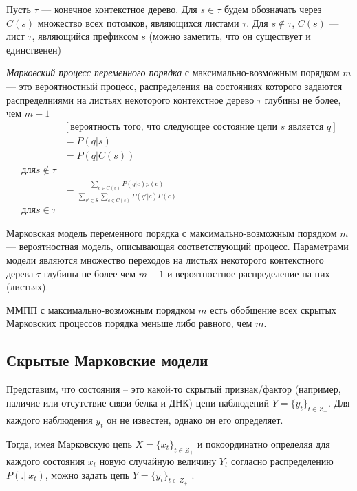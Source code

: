 \documentclass{matmex-diploma-custom}
\begin{document}
Пусть $\tau$ --- конечное контекстное дерево.
Для $s \in \tau$ будем обозначать через $ C(s) $ множество всех потомков, являющихся листами $\tau$. 
Для $s \notin \tau$, $C(s)$ --- лист $\tau$, являющийся префиксом  $s$ (можно заметить, что он существует и единственен)
\begin{definition}
\textit{Марковский процесс переменного порядка} с максимально-возможным порядком $m$--- это вероятностный процесс, распределения на состояниях которого задаются распределниями на листьях некоторого контекстное дерево $\tau$ глубины не более, чем $m+1$ 
\begin{align*}
&[\textit{вероятность того, что следующее состояние цепи $s$ является $q$}]
\\&=P(q |s)
\\&= P(q|C(s))
\\\text{для} s \notin \tau
\\&= \frac{\sum_{c \in C(s)} {P(q|c)p(c)}}{\sum_{q' \in S}\sum_{c \in C(s)} {P(q'|c)P(c)}} 
\\\text{для} s \in \tau
\end{align*}
\end{definition}

\begin{definition}
Марковская модель переменного порядка с максимально-возможным порядком $m$ --- вероятностная модель, описывающая соответствующий процесс.
Параметрами модели являются множество переходов на листьях некоторого контекстного дерева $\tau$ глубины не более чем $m+1$ и вероятностное распределение на них (листьях).
\end{definition}

\begin{remark}
ММПП с максимально-возможным порядком $m$ есть обобщение всех скрытых Марковских процессов порядка меньше либо равного, чем $ m $.
\end{remark}

\subsection{Скрытые Марковские модели}
Представим, что состояния -- это какой-то скрытый признак/фактор (например, наличие или отсутствие связи белка и ДНК) цепи наблюдений $Y = \{y_{t}\}_{t \in Z_{+}}$. Для каждого наблюдения $y_{t}$ он не известен, однако он его определяет.


Тогда, имея Марковскую цепь $X = \{x_{t}\}_{t \in Z_{+}}$ и покоординатно определяя для каждого состояния $x_{t}$ новую случайную величину $Y_{t}$ согласно распределению $P(.|~x_{t})$, можно задать цепь
$Y = \{y_{t}\}_{t \in Z_{+}}$ .
\end{document}
